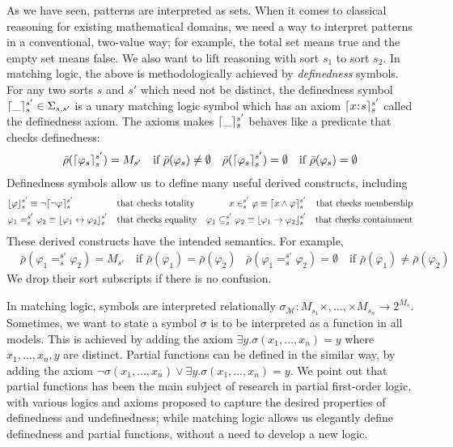 \documentclass[acmsmall,review,anonymous]{acmart}
\newcommand{\imp}{\to}
\newcommand{\dimp}{\leftrightarrow}
\newcommand{\ddd}{,\dots,}
\newcommand{\cln}{\mathbin{\!:\!}}
\newcommand{\MM}{\mathcal{M}}
\newcommand{\sigmaM}{{\sigma_{\MM}}}
\newcommand{\SigmaSub}[1]{\Sigma_{#1}}
\newcommand{\barrho}{\bar{\rho}}
\DeclarePairedDelimiter{\ceil}{\lceil}{\rceil}
\DeclarePairedDelimiter{\floor}{\lfloor}{\rfloor}
\begin{document}
As we have seen, patterns are interpreted as sets.
When it comes to classical reasoning for existing mathematical domains,
we need a way to interpret patterns in a conventional, two-value way;
for example, the total set means true and the empty set means false.
We also want to lift reasoning with sort $s_1$ to sort $s_2$.
In matching logic, the above is methodologically achieved by
\emph{definedness} symbols.
For any two sorts $s$ and $s'$ which need not be distinct, 
the definedness symbol
$\ceil{\_}_{s}^{s'} \in \SigmaSub{s,s'}$
is a unary matching logic symbol which has an axiom
$
\ceil{x \cln s}_{s}^{s'}
$
called the definedness axiom. 
The axioms makes $\ceil{\_}_{s}^{s'}$ behaves like a predicate
that checks definedness:
\begin{align*}
& \barrho(\ceil{\varphi_s}_{s}^{s'}) = M_{s'}
  \quad \text{if $\barrho(\varphi_s) \neq \emptyset$}
& \barrho(\ceil{\varphi_s}_{s}^{s'}) = \emptyset
  \quad \text{if $\barrho(\varphi_s) = \emptyset$}
\end{align*}
Definedness symbols allow us to define many useful derived constructs, including
\begin{align*}
&\floor{\varphi}_s^{s'} \equiv \neg \ceil{\neg \varphi}_s^{s'}
&& \text{that checks totality}
&x \in_s^{s'} \varphi \equiv \ceil{x \wedge \varphi}_s^{s'}
&& \text{that checks membership}
\\
&\varphi_1 =_s^{s'} \varphi_2 \equiv \floor{\varphi_1 \dimp \varphi_2}_s^{s'}
&& \text{that checks equality}
&\varphi_1 \subseteq_s^{s'} \varphi_2 
\equiv \floor{\varphi_1 \imp \varphi_2}_s^{s'}
&& \text{that checks containment}
\end{align*}
These derived constructs have the intended semantics.
For example,
\begin{align*}
& \barrho(\varphi_1 =_{s}^{s'} \varphi_2) = M_{s'}
  \quad \text{if $\barrho(\varphi_1) = \barrho(\varphi_2)$}
& \barrho(\varphi_1 =_{s}^{s'} \varphi_2) = \emptyset
  \quad \text{if $\barrho(\varphi_1) \neq \barrho(\varphi_2)$}
\end{align*}
We drop their sort subscripts if there is no confusion.

In matching logic, symbols are interpreted relationally
$\sigmaM \colon M_{s_1} \times \ddd \times M_{s_n} \to 2^{M_s}$.
Sometimes, we want to state a symbol $\sigma$ is to be interpreted
as a function in all models.
This is achieved by adding the axiom
$\exists y . \sigma(x_1 \ddd x_n) = y$
where $x_1 \ddd x_n , y$ are distinct.
Partial functions can be defined in the similar way, by adding the axiom
$\neg \sigma(x_1 \ddd x_n) \vee \exists y . \sigma(x_1 \ddd x_n) = y$.
We point out that partial functions has been the main subject of research
in partial first-order logic, with various logics and axioms proposed
to capture the desired properties of definedness and undefinedness;
while matching logic allows us elegantly define definedness and partial 
functions, without a need to develop a new logic.
\end{document}
